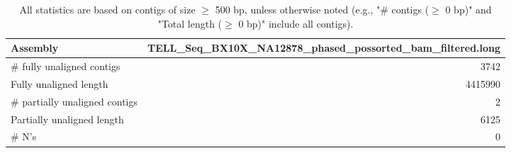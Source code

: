 \documentclass[12pt,a4paper]{article}
\begin{document}
\begin{table}[ht]
\begin{center}
\caption{All statistics are based on contigs of size $\geq$ 500 bp, unless otherwise noted (e.g., "\# contigs ($\geq$ 0 bp)" and "Total length ($\geq$ 0 bp)" include all contigs).}
\begin{tabular}{|l*{1}{|r}|}
\hline
Assembly & TELL\_Seq\_BX10X\_NA12878\_phased\_possorted\_bam\_filtered.long \\ \hline
\# fully unaligned contigs & 3742 \\ \hline
Fully unaligned length & 4415990 \\ \hline
\# partially unaligned contigs & 2 \\ \hline
Partially unaligned length & 6125 \\ \hline
\# N's & 0 \\ \hline
\end{tabular}
\end{center}
\end{table}
\end{document}
